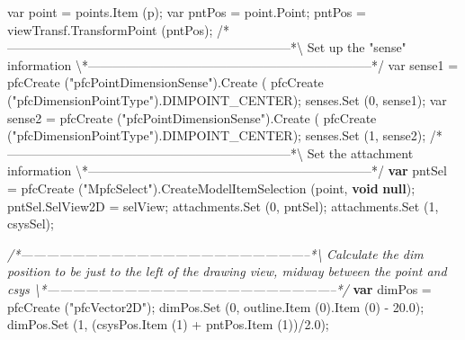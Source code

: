\documentclass[]{article}
\newenvironment{Shaded}{}{}
\newcommand{\KeywordTok}[1]{\textcolor[rgb]{0.00,0.44,0.13}{\textbf{{#1}}}}
\newcommand{\DecValTok}[1]{\textcolor[rgb]{0.25,0.63,0.44}{{#1}}}
\newcommand{\FloatTok}[1]{\textcolor[rgb]{0.25,0.63,0.44}{{#1}}}
\newcommand{\StringTok}[1]{\textcolor[rgb]{0.25,0.44,0.63}{{#1}}}
\newcommand{\CommentTok}[1]{\textcolor[rgb]{0.38,0.63,0.69}{\textit{{#1}}}}
\newcommand{\OtherTok}[1]{\textcolor[rgb]{0.00,0.44,0.13}{{#1}}}
\newcommand{\FunctionTok}[1]{\textcolor[rgb]{0.02,0.16,0.49}{{#1}}}
\newcommand{\NormalTok}[1]{{#1}}
\begin{document}
\begin{Shaded}
\begin{Highlighting}[]
\OtherTok{      var point = points.Item }\FloatTok{(}\OtherTok{p}\FloatTok{)}\OtherTok{;}
\OtherTok{      var pntPos = point.Point;}
\OtherTok{      }
\OtherTok{      pntPos = viewTransf.TransformPoint }\FloatTok{(}\OtherTok{pntPos}\FloatTok{)}\OtherTok{;}
\OtherTok{      }
\OtherTok{/}\NormalTok{*--------------------------------------------------------------------*\textbackslash{}  }
  \NormalTok{Set up the }\StringTok{"sense"} \NormalTok{information}
\NormalTok{\textbackslash{}*--------------------------------------------------------------------*}\OtherTok{/  }
\OtherTok{      var sense1 = pfcCreate }\FloatTok{(}\OtherTok{"pfcPointDimensionSense"}\FloatTok{)}\OtherTok{.Create }\FloatTok{(}
\OtherTok{            pfcCreate }\FloatTok{(}\OtherTok{"pfcDimensionPointType"}\FloatTok{)}\OtherTok{.DIMPOINT_CENTER}\FloatTok{)}\OtherTok{;}
\OtherTok{      senses.Set }\FloatTok{(}\OtherTok{0, sense1}\FloatTok{)}\OtherTok{;}
\OtherTok{      var sense2 = pfcCreate }\FloatTok{(}\OtherTok{"pfcPointDimensionSense"}\FloatTok{)}\OtherTok{.Create }\FloatTok{(}
\OtherTok{            pfcCreate }\FloatTok{(}\OtherTok{"pfcDimensionPointType"}\FloatTok{)}\OtherTok{.DIMPOINT_CENTER}\FloatTok{)}\OtherTok{;}
\OtherTok{      senses.Set }\FloatTok{(}\OtherTok{1, sense2}\FloatTok{)}\OtherTok{;}
\OtherTok{        }
\OtherTok{/}\NormalTok{*--------------------------------------------------------------------*\textbackslash{} }
  \NormalTok{Set the attachment information}
\NormalTok{\textbackslash{}*--------------------------------------------------------------------*}\OtherTok{/}
      \KeywordTok{var} \NormalTok{pntSel = }
    \FunctionTok{pfcCreate} \NormalTok{(}\StringTok{"MpfcSelect"}\NormalTok{).}\FunctionTok{CreateModelItemSelection} \NormalTok{(point, }
                               \KeywordTok{void} \KeywordTok{null}\NormalTok{);}
      \OtherTok{pntSel}\NormalTok{.}\FunctionTok{SelView2D} \NormalTok{= selView;}
      \OtherTok{attachments}\NormalTok{.}\FunctionTok{Set} \NormalTok{(}\DecValTok{0}\NormalTok{, pntSel);}
      \OtherTok{attachments}\NormalTok{.}\FunctionTok{Set} \NormalTok{(}\DecValTok{1}\NormalTok{, csysSel);}
        
\CommentTok{/*--------------------------------------------------------------------*\textbackslash{}  }
\CommentTok{  Calculate the dim position to be just to the left of the}
\CommentTok{  drawing view, midway between the point and csys}
\CommentTok{\textbackslash{}*--------------------------------------------------------------------*/} 
      \KeywordTok{var} \NormalTok{dimPos = }\FunctionTok{pfcCreate} \NormalTok{(}\StringTok{"pfcVector2D"}\NormalTok{);}
      \OtherTok{dimPos}\NormalTok{.}\FunctionTok{Set} \NormalTok{(}\DecValTok{0}\NormalTok{, }\OtherTok{outline}\NormalTok{.}\FunctionTok{Item} \NormalTok{(}\DecValTok{0}\NormalTok{).}\FunctionTok{Item} \NormalTok{(}\DecValTok{0}\NormalTok{) - }\FloatTok{20.0}\NormalTok{);}
      \OtherTok{dimPos}\NormalTok{.}\FunctionTok{Set} \NormalTok{(}\DecValTok{1}\NormalTok{, (}\OtherTok{csysPos}\NormalTok{.}\FunctionTok{Item} \NormalTok{(}\DecValTok{1}\NormalTok{) + }\OtherTok{pntPos}\NormalTok{.}\FunctionTok{Item} \NormalTok{(}\DecValTok{1}\NormalTok{))/}\FloatTok{2.0}\NormalTok{);}
        

\end{Highlighting}
\end{Shaded}
\end{document}
